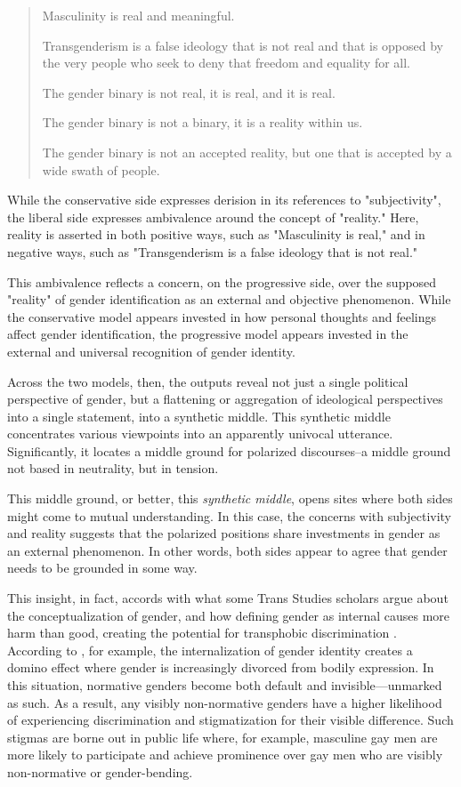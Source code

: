 \documentclass{article}
\begin{document}
\begin{quote}

Masculinity is real and meaningful.

Transgenderism is a false ideology that is not real and that is
opposed by the very people who seek to deny that freedom and equality
for all.

The gender binary is not real, it is real, and it is real.

The gender binary is not a binary, it is a reality within us.

The gender binary is not an accepted reality, but one that is accepted
by a wide swath of people.

\end{quote}

While the conservative side expresses derision in its references to "subjectivity", the liberal side expresses ambivalence around the concept of "reality." Here, reality is asserted in both positive ways, such as "Masculinity is real," and in negative ways, such as "Transgenderism is a false ideology that is not real." 

This ambivalence reflects a concern, on the progressive side, over the supposed "reality" of gender identification as an external and objective phenomenon. While the conservative model appears invested in how personal thoughts and feelings affect gender identification, the progressive model appears invested in the external and universal recognition of gender identity.

Across the two models, then, the outputs reveal not just a single political perspective of gender, but a flattening or aggregation of ideological perspectives into a single statement, into a synthetic middle. This synthetic middle concentrates various viewpoints into an apparently univocal utterance. Significantly, it locates a middle ground for polarized discourses--a middle ground not based in neutrality, but in tension.

This middle ground, or better, this \textit{synthetic middle}, opens sites where both sides might come to mutual understanding. In this case, the concerns with subjectivity and reality suggests that the polarized positions share investments in gender as an external phenomenon. In other words, both sides appear to agree that gender needs to be grounded in some way. 

This insight, in fact, accords with what some Trans Studies scholars argue about the conceptualization of gender, and how defining gender as internal causes more harm than good, creating the potential for transphobic discrimination \citep{amin_2022,chu_2024}. According to \citet{amin_2022}, for example, the internalization of gender identity creates a domino effect where gender is increasingly divorced from bodily expression. In this situation, normative genders become both default and invisible—unmarked as such. As a result, any visibly non-normative genders have a higher likelihood of experiencing discrimination and stigmatization for their visible difference. Such stigmas are borne out in public life where, for example, masculine gay men are more likely to participate and achieve prominence over gay men who are visibly non-normative or gender-bending.
\end{document}
